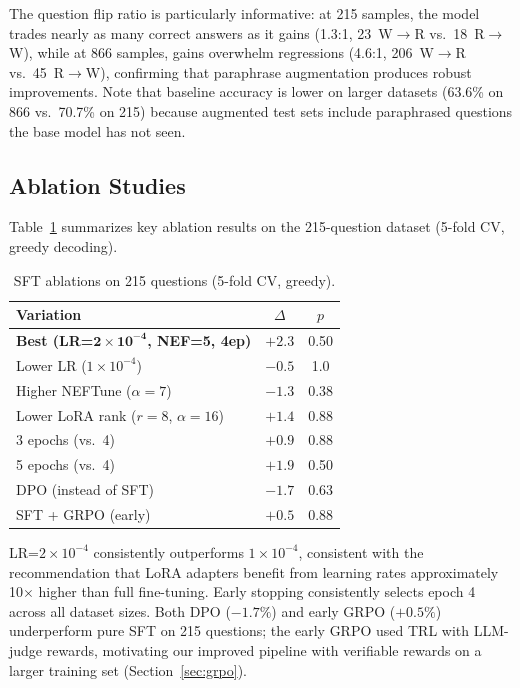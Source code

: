 The question flip ratio is particularly informative: at 215 samples, the model trades nearly as many correct answers as it gains (1.3:1, 23~W$\to$R vs.\ 18~R$\to$W), while at 866 samples, gains overwhelm regressions (4.6:1, 206~W$\to$R vs.\ 45~R$\to$W), confirming that paraphrase augmentation produces robust improvements. Note that baseline accuracy is lower on larger datasets (63.6\% on 866 vs.\ 70.7\% on 215) because augmented test sets include paraphrased questions the base model has not seen.

\subsection{Ablation Studies}
\label{sec:sft:ablation}

Table~\ref{tab:ablations} summarizes key ablation results on the 215-question dataset (5-fold CV, greedy decoding).

\begin{table}[t]
\centering
\small
\caption{SFT ablations on 215 questions (5-fold CV, greedy).}
\label{tab:ablations}
\begin{tabular}{@{}lcc@{}}
\toprule
Variation & $\Delta$ & $p$ \\
\midrule
\textbf{Best (LR=$\mathbf{2\!\times\!10^{-4}}$, NEF=5, 4ep)} & $\boldsymbol{+2.3}$ & 0.50 \\
Lower LR ($1\!\times\!10^{-4}$) & $-0.5$ & 1.0 \\
Higher NEFTune ($\alpha\!=\!7$) & $-1.3$ & 0.38 \\
Lower LoRA rank ($r\!=\!8$, $\alpha\!=\!16$) & $+1.4$ & 0.88 \\
3 epochs (vs.\ 4) & $+0.9$ & 0.88 \\
5 epochs (vs.\ 4) & $+1.9$ & 0.50 \\
DPO (instead of SFT) & $-1.7$ & 0.63 \\
SFT + GRPO (early) & $+0.5$ & 0.88 \\
\bottomrule
\end{tabular}
\end{table}

LR=$2\!\times\!10^{-4}$ consistently outperforms $1\!\times\!10^{-4}$, consistent with the recommendation that LoRA adapters benefit from learning rates approximately 10$\times$ higher than full fine-tuning. Early stopping consistently selects epoch 4 across all dataset sizes. Both DPO ($-1.7\%$) and early GRPO ($+0.5\%$) underperform pure SFT on 215 questions; the early GRPO used TRL with LLM-judge rewards, motivating our improved pipeline with verifiable rewards on a larger training set (Section~\ref{sec:grpo}).
